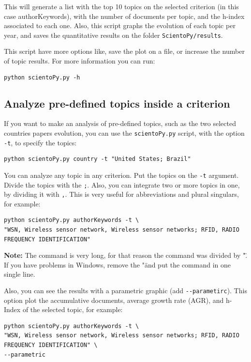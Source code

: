 \documentclass[10pt,letterpaper]{article}
\begin{document}
This will generate a list with the top 10 topics on the selected criterion (in this case authorKeywords), with the number of documents per topic, and the h-index associated to each one. Also, this script graphs the evolution of each topic per year, and saves the quantitative results on the folder \verb|ScientoPy/results|. 

This script have more options like, save the plot on a file, or increase the number of topic results. For more information you can run:

\begin{verbatim}
python scientoPy.py -h
\end{verbatim}

\subsection{Analyze pre-defined topics inside a criterion}

If you want to make an analysis of pre-defined topics, such as the two selected countries papers evolution, you can use the \verb|scientoPy.py| script, with the option \verb|-t|, to specify the topics: 

\begin{verbatim}
python scientoPy.py country -t "United States; Brazil"
\end{verbatim}

You can analyze any topic in any criterion. Put the topics on the \verb|-t| argument. Divide the topics with the \verb|;|. Also, you can integrate two or more topics in one, by dividing it with \verb|,|. This is very useful for abbreviations and plural singulars, for example: 
\begin{verbatim}
python scientoPy.py authorKeywords -t \
"WSN, Wireless sensor network, Wireless sensor networks; RFID, RADIO FREQUENCY IDENTIFICATION"
\end{verbatim}

\textbf{Note: } The command is very long, for that reason the command was divided by "\". If you have problems in Windows, remove the "\" and put the command in one single line.

Also, you can see the results with a parametric graphic (add \verb|--parametirc|). This option plot the accumulative documents, average growth rate (AGR), and h-Index of the selected topic, for example:

\begin{verbatim}
python scientoPy.py authorKeywords -t \
"WSN, Wireless sensor network, Wireless sensor networks; RFID, RADIO FREQUENCY IDENTIFICATION" \
--parametric
\end{verbatim}
\end{document}
